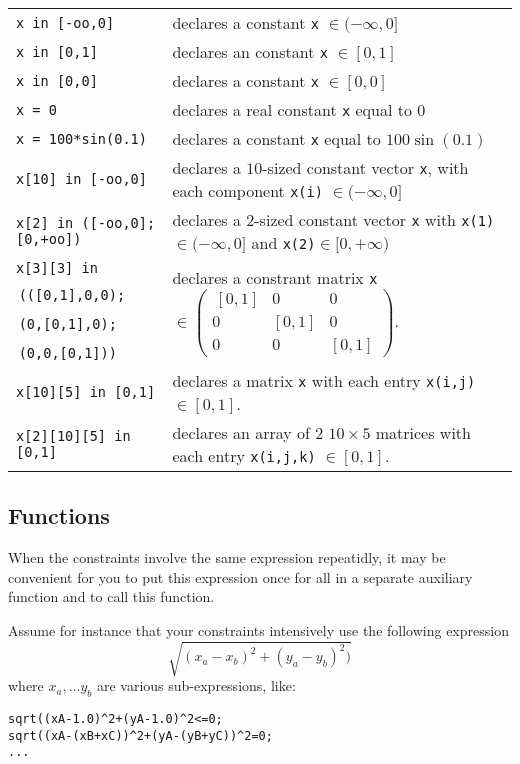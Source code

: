 \begin{tabular}{p{}|p{}}
\hline
{\tt x in [-oo,0]} & declares a constant {\tt x} $\in(-\infty,0]$ \\
{\tt x in [0,1]} & declares an constant {\tt x} $\in[0,1]$ \\
{\tt x in [0,0]} & declares a constant {\tt x} $\in[0,0]$ \\
{\tt x = 0} & declares a real constant {\tt x} equal to $0$ \\
{\tt x = 100*sin(0.1)} & declares a constant {\tt x} equal to $100\sin(0.1)$ \\
{\tt x[10] in [-oo,0]} & declares a $10$-sized constant vector {\tt x}, with each component {\tt x(i)} $\in(-\infty,0]$ \\
{\tt x[2] in ([-oo,0];[0,+oo])} & declares a $2$-sized constant vector {\tt x} with {\tt x(1)}$\in(-\infty,0]$ and {\tt x(2)}$\in[0,+\infty)$ \\
{\tt x[3][3] in} &  \multirow{4}{*}{declares a constrant matrix 
{\tt x} $\in\begin{pmatrix}
\!\,[0,1] & 0 & 0 \\
0 & [0,1]& 0 \\
0 & 0 & [0,1] 
\end{pmatrix}$.} \\
\!\,{\tt (([0,1],0,0);} & \\
\!\,{\tt (0,[0,1],0);} & \\
\!\,{\tt (0,0,[0,1]))} &\\
{\tt x[10][5] in [0,1]} & declares a matrix {\tt x} with each entry {\tt x(i,j)} $\in[0,1]$.\\
{\tt x[2][10][5] in [0,1]} & declares an array of 2 $10\times 5$ matrices with each entry {\tt x(i,j,k)} $\in[0,1]$.\\
\end{tabular}

\subsection{Functions}\label{sec:mod-func-quimper}

When the constraints involve the same expression repeatidly, it may be
convenient for you to put this expression once for all in a separate auxiliary
function and to call this function.

Assume for instance that your constraints intensively use the following expression
$$\sqrt{(x_a-x_b)^2+(y_a-y_b)^2)}$$
where $x_a,\ldots y_b$ are various sub-expressions, like:
\begin{verbatim}
sqrt((xA-1.0)^2+(yA-1.0)^2<=0;
sqrt((xA-(xB+xC))^2+(yA-(yB+yC))^2=0;
...
\end{verbatim}

